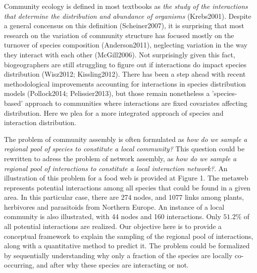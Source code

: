 \documentclass[12pt]{article}
\begin{document}
Community ecology is defined in most textbooks as \emph{the study of the
interactions that determine the distribution and abundance of organisms}
(Krebs2001). Despite a general concensus on this definition (Scheiner2007), it
is surprising that most research on the variation of community structure has
focused mostly on the turnover of species composition (Anderson2011),
neglecting variation in the way they interact with each other (McGill2006).
Not surprisingly given this fact, biogeographers are still struggling to
figure out if interactions do impact species distribution (Wisz2012;
Kissling2012). There has been a step ahead with recent methodological
improvements accounting for interactions in species distribution models
(Pollock2014; Pelissier2013), but those remain nonetheless a 'species- based'
approach to communities where interactions are fixed covariates affecting
distribution. Here we plea for a more integrated approach of species and
interaction distribution.

The problem of community assembly is often formulated as \emph{how do we
sample a regional pool of species to constitute a local community?} This
question could be rewritten to adress the problem of network assembly, as
\emph{how do we sample a regional pool of interactions to constitute a local
interaction network?}. An illustration of this problem for a food web is
provided at Figure 1. The metaweb represents potential interactions among all
species that could be found in a given area. In this particular case, there
are 274 nodes, and 1077 links among plants, herbivores and parasitoids from
Northern Europe. An instance of a local community is also illustrated, with 44
nodes and 160 interactions. Only $51.2\%$ of all potential interactions are
realized. Our objective here is to provide a conceptual framework to explain
the sampling of the regional pool of interactions, along with a quantitative
method to predict it. The problem could be formalized by sequentially
understanding why only a fraction of the species are locally co-occurring, and
after why these species are interacting or not.
\end{document}
